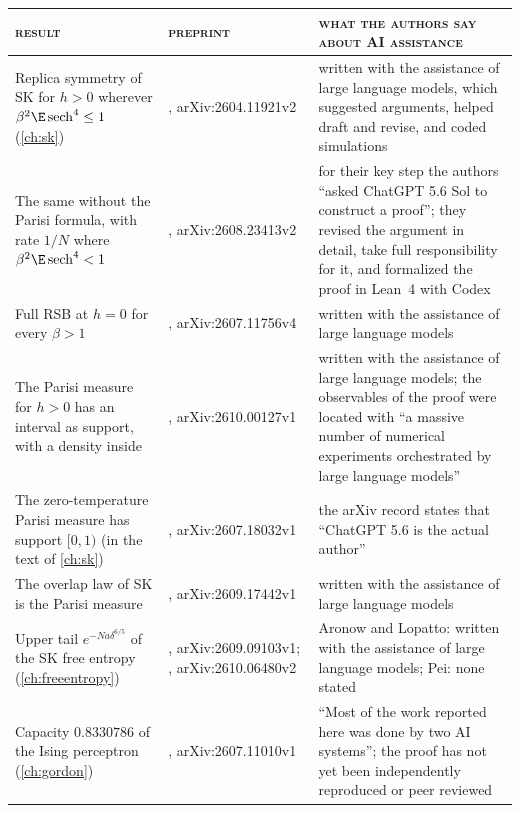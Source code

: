 \begin{refsection}
\begin{table}[t]
\begin{fullwidth}
\footnotesize
\renewcommand{\arraystretch}{1.2}
\begin{tabularx}{\linewidth}{@{}>{\raggedright\arraybackslash}p{38mm}>{\raggedright\arraybackslash}p{30mm}>{\raggedright\arraybackslash}X@{}}
\toprule
\textsc{\color{stone}result} & \textsc{\color{stone}preprint} & \textsc{\color{stone}what the authors say about AI assistance}\\
\midrule
Replica symmetry of SK for $h>0$ wherever $\beta^2\E\,\mathrm{sech}^4\le1$ (\cref{ch:sk}) & \textcite{Lopatto2026a}, arXiv:2604.11921v2 & written with the assistance of large language models, which suggested arguments, helped draft and revise, and coded simulations\\
The same without the Parisi formula, with rate $1/N$ where $\beta^2\E\,\mathrm{sech}^4<1$ & \textcite{KusuokaNakajima2026b}, arXiv:2608.23413v2 & for their key step the authors \enquote{asked ChatGPT 5.6 Sol to construct a proof}; they revised the argument in detail, take full responsibility for it, and formalized the proof in Lean~4 with Codex\\
Full RSB at $h=0$ for every $\beta>1$ & \textcite{Lopatto2026b}, arXiv:2607.11756v4 & written with the assistance of large language models\\
The Parisi measure for $h>0$ has an interval as support, with a density inside & \textcite{Lopatto2026c}, arXiv:2610.00127v1 & written with the assistance of large language models; the observables of the proof were located with \enquote{a massive number of numerical experiments orchestrated by large language models}\\
The zero-temperature Parisi measure has support $[0,1)$ (in the text of \cref{ch:sk}) & \textcite{ChenHB2026}, arXiv:2607.18032v1 & the arXiv record states that \enquote{ChatGPT 5.6 is the actual author}\\
The overlap law of SK is the Parisi measure & \textcite{AronowLopatto2026b}, arXiv:2609.17442v1 & written with the assistance of large language models\\
Upper tail $e^{-Na\delta^{6/5}}$ of the SK free entropy (\cref{ch:freeentropy}) & \textcite{AronowLopatto2026a}, arXiv:2609.09103v1; \textcite{Pei2026}, arXiv:2610.06480v2 & Aronow and Lopatto: written with the assistance of large language models; Pei: none stated\\
Capacity $0.8330786$ of the Ising perceptron (\cref{ch:gordon}) & \textcite{Shmalo2026}, arXiv:2607.11010v1 & \enquote{Most of the work reported here was done by two AI systems}; the proof has not yet been independently reproduced or peer reviewed\\

\end{tabularx}
\end{fullwidth}
\end{table}
\end{refsection}
